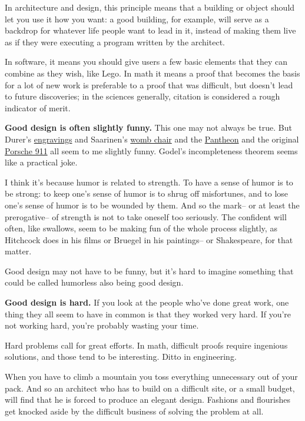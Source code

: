 In architecture and design, this
principle means that a building or object should let you 
use it how you want: a good building, for example, will
serve as a backdrop for whatever life people want to lead in it, instead
of making them live as if they were executing a program
written by the architect.

In software, it means you should give users a few
basic elements that they can combine as they wish, like Lego. 
In math it means a proof that
becomes the basis for a lot of new work is
preferable to a proof that was difficult,
but doesn't lead to future discoveries; in the
sciences generally, citation is considered a rough
indicator of merit.



\textbf{Good design is often slightly funny.}  This one
may not always be true.  But Durer's 
\href{http://www.paulgraham.com/pilate.html}{engravings}
and Saarinen's 
\href{http://www.paulgraham.com/womb.html}{womb chair} and the 
\href{http://www.paulgraham.com/pantheon.html}{Pantheon} and the
original \href{http://www.paulgraham.com/1974-911s.html}{Porsche 911} all seem
to me slightly funny.  Godel's incompleteness theorem
seems like a practical joke.

I think it's because humor is related to strength.
To have a sense of humor is to be strong:
to keep one's sense of humor is to shrug off misfortunes,
and to lose one's sense of humor is to be wounded by them.
And so the mark-- or at least the prerogative-- of strength
is not to take
oneself too seriously.
The confident will often, like
swallows, seem to be making fun of the whole process slightly,
as Hitchcock does in his films or Bruegel in his paintings-- or
Shakespeare, for that matter.

Good design may not have to be funny, but it's hard to
imagine something that could be called humorless also being
good design.



\textbf{Good design is hard.}  If you look at the people who've
done great work, one thing they all seem to have in common is that they
worked very hard.  If you're not working hard,
you're probably wasting your time.

Hard problems call for great
efforts.  In math, difficult proofs require ingenious solutions,
and those tend to be interesting.  Ditto in engineering.

When you
have to climb a mountain you toss everything unnecessary
out of your pack.  And so an architect who has to build
on a difficult site, or a small budget, will find that he
is forced to produce an elegant design.  Fashions and
flourishes get knocked aside by the difficult business
of solving the problem at all.

